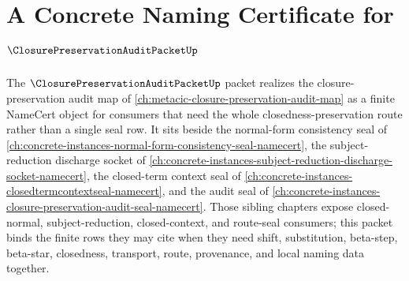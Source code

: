 \chapter{A Concrete Naming Certificate for $\ClosurePreservationAuditPacketUp$}
\label{ch:concrete-instances-closure-preservation-audit-packet-namecert}

The $\ClosurePreservationAuditPacketUp$ packet realizes the closure-preservation audit map of \autoref{ch:metacic-closure-preservation-audit-map} as a finite NameCert object for consumers that need the whole closedness-preservation route rather than a single seal row. It sits beside the normal-form consistency seal of \autoref{ch:concrete-instances-normal-form-consistency-seal-namecert}, the subject-reduction discharge socket of \autoref{ch:concrete-instances-subject-reduction-discharge-socket-namecert}, the closed-term context seal of \autoref{ch:concrete-instances-closedtermcontextseal-namecert}, and the audit seal of \autoref{ch:concrete-instances-closure-preservation-audit-seal-namecert}. Those sibling chapters expose closed-normal, subject-reduction, closed-context, and route-seal consumers; this packet binds the finite rows they may cite when they need shift, substitution, beta-step, beta-star, closedness, transport, route, provenance, and local naming data together.

